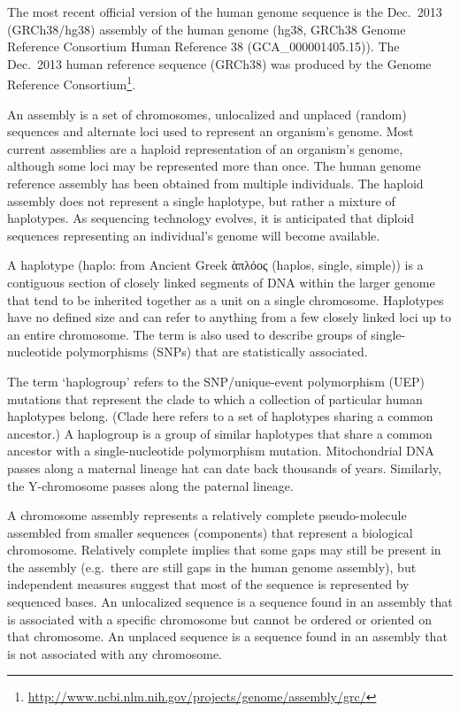 \documentclass[]{book}
\let\rmarkdownfootnote\footnote%
\def\footnote{\protect\rmarkdownfootnote}
\renewcommand{\href}[2]{#2\footnote{\url{#1}}}
\begin{document}
The most recent official version of the human genome sequence is the Dec.~2013 (GRCh38/hg38) assembly of the human genome (hg38, GRCh38 Genome Reference Consortium Human Reference 38 (GCA\_000001405.15)). The Dec.~2013 human reference sequence (GRCh38) was produced by the \href{http://www.ncbi.nlm.nih.gov/projects/genome/assembly/grc/}{Genome Reference Consortium}.

An assembly is a set of chromosomes, unlocalized and unplaced (random) sequences and alternate loci used to represent an organism's genome. Most current assemblies are a haploid representation of an organism's genome, although some loci may be represented more than once. The human genome reference assembly has been obtained from multiple individuals. The haploid assembly does not represent a single haplotype, but rather a mixture of haplotypes. As sequencing technology evolves, it is anticipated that diploid sequences representing an individual's genome will become available.

A haplotype (haplo: from Ancient Greek ὰπλόος (haplos, single, simple)) is a contiguous section of closely linked segments of DNA within the larger genome that tend to be inherited together as a unit on a single chromosome. Haplotypes have no defined size and can refer to anything from a few closely linked loci up to an entire chromosome. The term is also used to describe groups of single-nucleotide polymorphisms (SNPs) that are statistically associated.

The term `haplogroup' refers to the SNP/unique-event polymorphism (UEP) mutations that represent the clade to which a collection of particular human haplotypes belong. (Clade here refers to a set of haplotypes sharing a common ancestor.) A haplogroup is a group of similar haplotypes that share a common ancestor with a single-nucleotide polymorphism mutation. Mitochondrial DNA passes along a maternal lineage hat can date back thousands of years. Similarly, the Y-chromosome passes along the paternal lineage.

A chromosome assembly represents a relatively complete pseudo-molecule assembled from smaller sequences (components) that represent a biological chromosome. Relatively complete implies that some gaps may still be present in the assembly (e.g.~there are still gaps in the human genome assembly), but independent measures suggest that most of the sequence is represented by sequenced bases. An unlocalized sequence is a sequence found in an assembly that is associated with a specific chromosome but cannot be ordered or oriented on that chromosome. An unplaced sequence is a sequence found in an assembly that is not associated with any chromosome.
\end{document}

